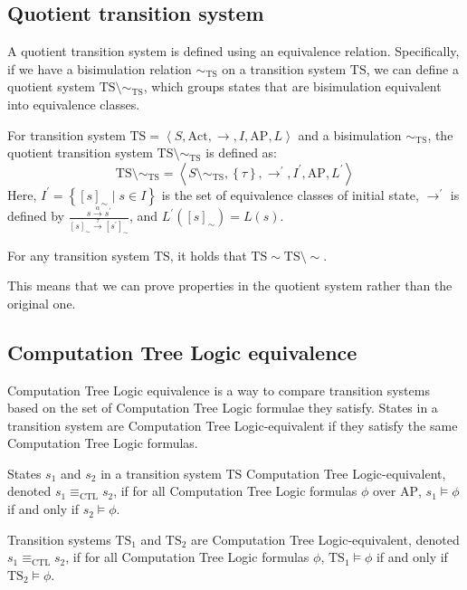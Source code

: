 \subsection{Quotient transition system}
A quotient transition system is defined using an equivalence relation. 
Specifically, if we have a bisimulation relation $\sim_{\text{TS}}$ on a transition system $\text{TS}$, we can define a quotient system $\text{TS}\setminus\sim_{\text{TS}}$, which groups states that are bisimulation equivalent into equivalence classes.
\begin{definition}
    For transition system $\text{TS}=\left\langle S,\text{Act},\rightarrow,I,\text{AP},L\right\rangle$ and a bisimulation $\sim_{\text{TS}}$, the quotient transition system $\text{TS}\setminus\sim_{\text{TS}}$ is defined as:
    \[\text{TS}\setminus\sim_{\text{TS}}=\left\langle S\setminus\sim_{\text{TS}},\left\{\tau\right\},\rightarrow^\prime,I^\prime,\text{AP},L^\prime\right\rangle\]
    Here, $I^\prime=\left\{[s]_{\sim}\mid s \in I\right\}$ is the set of equivalence classes of initial state, $\rightarrow^\prime$ is defined by $\frac{s\overset{\alpha}{\rightarrow}s^\prime}{[s]_{\sim}\overset{\tau}{\rightarrow}[s^\prime]_{\sim}}$, and $L^\prime([s]_{\sim})=L(s)$.
\end{definition}
\begin{theorem}
    For any transition system $\text{TS}$, it holds that $\text{TS}\sim\text{TS}\setminus\sim$. 
\end{theorem}
\noindent This means that we can prove properties in the quotient system rather than the original one.

\subsection{Computation Tree Logic equivalence}
Computation Tree Logic equivalence is a way to compare transition systems based on the set of Computation Tree Logic formulae they satisfy. 
States in a transition system are Computation Tree Logic-equivalent if they satisfy the same Computation Tree Logic formulas. 

\begin{definition}
    States $s_1$ and $s_2$ in a transition system $\text{TS}$ Computation Tree Logic-equivalent, denoted $s_1 \equiv_{\text{CTL}} s_2$, if for all Computation Tree Logic formulas $\phi$ over $\text{AP}$, $s_1 \models \phi$ if and only if $s_2 \models \phi$.
\end{definition}
\begin{definition}
    Transition systems $\text{TS}_1$ and $\text{TS}_2$ are Computation Tree Logic-equivalent, denoted $s_1 \equiv_{\text{CTL}} s_2$, if for all Computation Tree Logic formulas $\phi$, $\text{TS}_1 \models \phi$ if and only if $\text{TS}_2 \models \phi$.
\end{definition}

